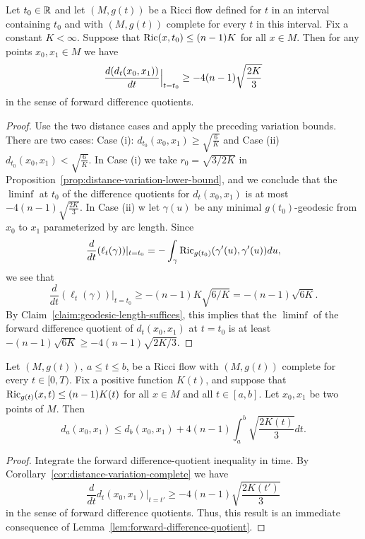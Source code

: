 \begin{corollary}\label{cor:distance-variation-complete}
\label{2ndI.8.3}

Let $t_0\in \mathbb{R}$ and let $(M,g(t))$ be a Ricci flow defined for $t$ in an
interval
containing $t_0$ and with $(M,g(t))$ complete for every $t$ in this
interval. Fix a constant $K<\infty$. Suppose that $\operatorname{Ric}(x,t_0)\le (n-1)K$
for all $x\in M$.
 Then for any points $x_0,x_1\in M$ we have
$$\frac{d(d_t(x_0,x_1))}{dt}\Bigl|_{t=t_0}\Bigr.\ge -4(n-1)\sqrt{\frac{2K}{3}}$$
in the sense of forward difference quotients.
\end{corollary}

\begin{proof}
\sketch Use the two distance cases and apply the preceding variation bounds.
There are two cases: Case (i): $d_{t_0}(x_0,x_1)\ge
\sqrt{\frac{6}{K}}$ and Case (ii) $d_{t_0}(x_0,x_1)<
\sqrt{\frac{6}{K}}$. In Case (i) we  take $r_0=\sqrt{3/2K}$ in
Proposition~\ref{prop:distance-variation-lower-bound}, and we conclude that the $\liminf$ at
$t_0$ of the difference quotients for $d_{t}(x_0,x_1)$ is at most
$-4(n-1)\sqrt{\frac{2K}{3}}$. In Case (ii) w let $\gamma(u)$ be any
minimal $g(t_0)$-geodesic from $x_0$ to $x_1$ parameterized by arc
length. Since
$$\frac{d}{dt}(\ell_t(\gamma))|_{t=t_0}=-\int_\gamma
\operatorname{Ric}_{g(t_0)}(\gamma'(u),\gamma'(u))du,$$ we see that
$$\frac{d}{dt}(\ell_t(\gamma))|_{t=t_0}\ge
-(n-1)K\sqrt{6/K}=-(n-1)\sqrt{6K}.$$ By Claim~\ref{claim:geodesic-length-suffices}, this
implies that the $\liminf$ of the forward difference quotient of
$d_t(x_0,x_1)$ at $t=t_0$ is at least $-(n-1)\sqrt{6K}\ge
-4(n-1)\sqrt{2K/3}$.
\end{proof}



\begin{corollary}\label{cor:distance-integral-bound}
\label{corI.8.3}

 Let $(M,g(t)),\ a\le t\le b$, be a Ricci flow with $(M,g(t))$ complete for every $t
\in [0,T)$. Fix a positive function $K(t)$, and suppose that $\operatorname{Ric}_{g(t)}(x,t)\le (n-1)K(t)$ for all $x\in M$ and all $t\in [a,b]$. Let
$x_0,x_1$ be two points of $M$. Then
$$d_a(x_0,x_1)\le d_b(x_0,x_1)+4(n-1)\int_a^b\sqrt{\frac{2K(t)}{3}}dt.$$
\end{corollary}


\begin{proof}
\sketch Integrate the forward difference-quotient inequality in time.
By Corollary~\ref{cor:distance-variation-complete} we have
\begin{equation}\label{liminf}
\frac{d}{dt}d_t(x_0,x_1)|_{t=t'}\ge -4(n-1)\sqrt{\frac{2K(t')}{3}}
\end{equation}
in the sense  of forward difference quotients. Thus, this result is
an immediate consequence of Lemma~\ref{lem:forward-difference-quotient}.
\end{proof}


